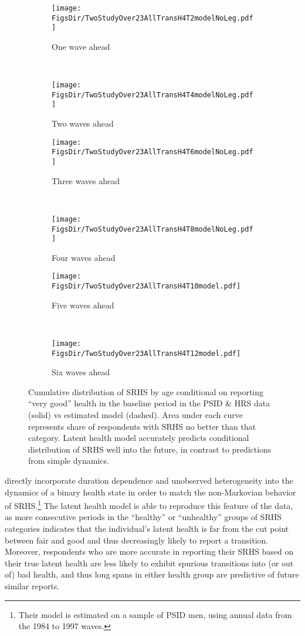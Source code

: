 \documentclass[12pt,pdftex,letterpaper]{article}
\newcommand{\RootDir}{..}
\newcommand{\FigsDir}{\RootDir/Figures}
\begin{document}
\begin{figure}
	\centering
	\begin{subfigure}[b]{0.45\textwidth}
		\texttt{[image: \\FigsDir/TwoStudyOver23AllTransH4T2modelNoLeg.pdf]}
		\caption{One wave ahead}\label{fig:Model1AheadVeryGood}
	\end{subfigure}
	~
	\begin{subfigure}[b]{0.45\textwidth}
		\texttt{[image: \\FigsDir/TwoStudyOver23AllTransH4T4modelNoLeg.pdf]}
		\caption{Two waves ahead}\label{fig:Model2AheadVeryGood}
	\end{subfigure}
	
	\begin{subfigure}[b]{0.45\textwidth}
		\texttt{[image: \\FigsDir/TwoStudyOver23AllTransH4T6modelNoLeg.pdf]}
		\caption{Three waves ahead}\label{fig:Model3AheadVeryGood}
	\end{subfigure}
	~
	\begin{subfigure}[b]{0.45\textwidth}
		\texttt{[image: \\FigsDir/TwoStudyOver23AllTransH4T8modelNoLeg.pdf]}
		\caption{Four waves ahead}\label{fig:Model4AheadVeryGood}
	\end{subfigure}
	
	\begin{subfigure}[b]{0.45\textwidth}
		\texttt{[image: \\FigsDir/TwoStudyOver23AllTransH4T10model.pdf]}
		\caption{Five waves ahead}\label{fig:Model5AheadVeryGood}
	\end{subfigure}
	~
	\begin{subfigure}[b]{0.45\textwidth}
		\texttt{[image: \\FigsDir/TwoStudyOver23AllTransH4T12model.pdf]}
		\caption{Six waves ahead}\label{fig:Model6AheadVeryGood}
	\end{subfigure}
	\caption{Cumulative distribution of SRHS by age conditional on reporting ``very good'' health in the baseline period in the PSID \& HRS data (solid) vs estimated model (dashed). Area under each curve represents share of respondents with SRHS no better than that category. Latent health model accurately predicts conditional distribution of SRHS well into the future, in contrast to predictions from simple dynamics.}\label{fig:ModelTransVG}
\end{figure}


\cite{DeNardi18} directly incorporate duration dependence and unobserved heterogeneity into the dynamics of a binary health state in order to match the non-Markovian behavior of SRHS.\footnote{Their model is estimated on a sample of PSID men, using annual data from the 1984 to 1997 waves.}  The latent health model is able to reproduce this feature of the data, as more consecutive periods in the ``healthy'' or ``unhealthy'' groups of SRHS categories indicates that the individual's latent health is far from the cut point between fair and good and thus decreasingly likely to report a transition. Moreover, respondents who are more accurate in reporting their SRHS based on their true latent health are less likely to exhibit spurious transitions into (or out of) bad health, and thus long spans in either health group are predictive of future similar reports.
\end{document}
